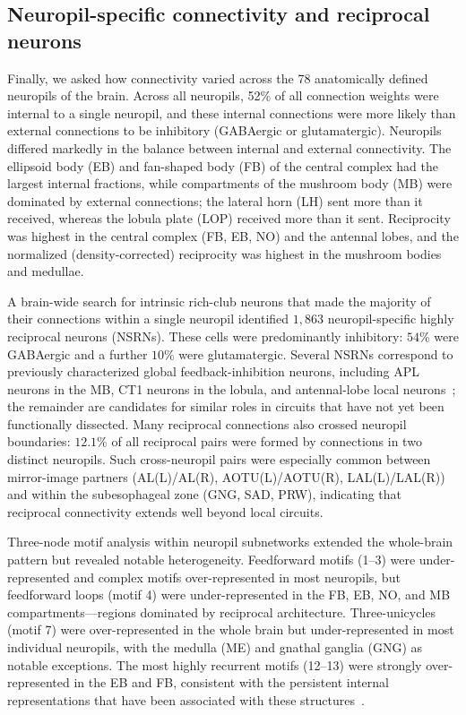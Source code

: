 \documentclass[11pt]{article}
\begin{document}
\subsection{Neuropil-specific connectivity and reciprocal neurons}

Finally, we asked how connectivity varied across the 78 anatomically
defined neuropils of the brain. Across all neuropils, 52\% of all
connection weights were internal to a single neuropil, and these internal
connections were more likely than external connections to be inhibitory
(GABAergic or glutamatergic). Neuropils differed markedly in the balance
between internal and external connectivity. The ellipsoid body (EB) and
fan-shaped body (FB) of the central complex had the largest internal
fractions, while compartments of the mushroom body (MB) were dominated by
external connections; the lateral horn (LH) sent more than it received,
whereas the lobula plate (LOP) received more than it sent. Reciprocity
was highest in the central complex (FB, EB, NO) and the antennal lobes,
and the normalized (density-corrected) reciprocity was highest in the
mushroom bodies and medullae.

A brain-wide search for intrinsic rich-club neurons that made the majority
of their connections within a single neuropil identified $1{,}863$
neuropil-specific highly reciprocal neurons (NSRNs). These cells were
predominantly inhibitory: $54\%$ were GABAergic and a further $10\%$ were
glutamatergic. Several NSRNs correspond to previously characterized
global feedback-inhibition neurons, including APL neurons in the MB, CT1
neurons in the lobula, and antennal-lobe local neurons~\cite{amin2020inhibitory,takemura2017complete};
the remainder are candidates for similar roles in circuits that have not
yet been functionally dissected. Many reciprocal connections also crossed
neuropil boundaries: $12.1\%$ of all reciprocal pairs were formed by
connections in two distinct neuropils. Such cross-neuropil pairs were
especially common between mirror-image partners (AL(L)/AL(R),
AOTU(L)/AOTU(R), LAL(L)/LAL(R)) and within the subesophageal zone (GNG,
SAD, PRW), indicating that reciprocal connectivity extends well beyond
local circuits.

Three-node motif analysis within neuropil subnetworks extended the
whole-brain pattern but revealed notable heterogeneity. Feedforward
motifs (1--3) were under-represented and complex motifs over-represented
in most neuropils, but feedforward loops (motif 4) were under-represented
in the FB, EB, NO, and MB compartments---regions dominated by reciprocal
architecture. Three-unicycles (motif 7) were over-represented in the
whole brain but under-represented in most individual neuropils, with the
medulla (ME) and gnathal ganglia (GNG) as notable exceptions. The most
highly recurrent motifs (12--13) were strongly over-represented in the EB
and FB, consistent with the persistent internal representations that have
been associated with these structures~\cite{seelig2015neural,hulse2021connectome}.
\end{document}
